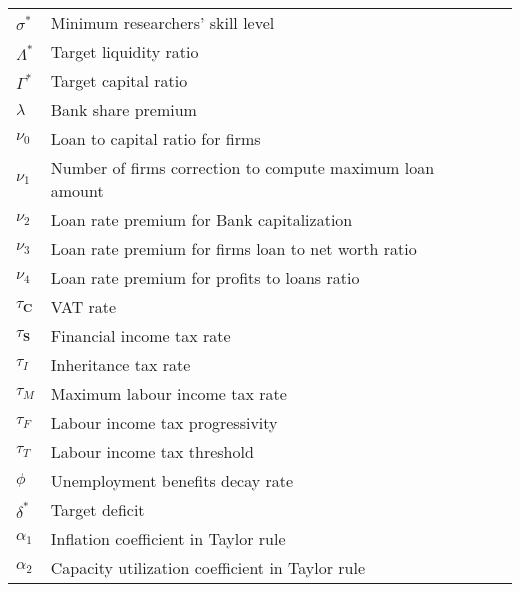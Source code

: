 \documentclass[a4paper, headings=standardclasses]{scrartcl}
\begin{document}
\begin{tabularx}{\linewidth}{lXll}
	$\sigma^*$         & Minimum researchers' skill level                          &       &        \\
	$\Lambda^*$        & Target liquidity ratio                                    &       &        \\
	$\Gamma^*$         & Target capital ratio                                      &       &        \\
	$\lambda$          & Bank share premium                                        &       &        \\
	$\nu_0$            & Loan to capital ratio for firms                           &       &        \\
	$\nu_1$            & Number of firms correction to compute maximum loan amount &       &        \\
	$\nu_2$            & Loan rate premium for Bank capitalization                 &       &        \\
	$\nu_3$            & Loan rate premium for firms loan to net worth ratio       &       &        \\
	$\nu_4$            & Loan rate premium for profits to loans ratio              &       &        \\
	$\tau_\mathbf{C}$  & VAT rate                                                  &       &        \\
	$\tau_\mathbf{S}$  & Financial income tax rate                                 &       &        \\
	$\tau_I$           & Inheritance tax rate                                      &       &        \\
	$\tau_M$           & Maximum labour income tax rate                            &       &        \\
	$\tau_F$           & Labour income tax progressivity                           &       &        \\
	$\tau_T$           & Labour income tax threshold                               &       &        \\
	$\phi$             & Unemployment benefits decay rate                          &       &        \\
	$\delta^*$         & Target deficit                                            &       &        \\
	$\alpha_1$         & Inflation coefficient in Taylor rule                      &       &        \\
	$\alpha_2$         & Capacity utilization coefficient in Taylor rule           &       &        \\

\end{tabularx}
\end{document}
